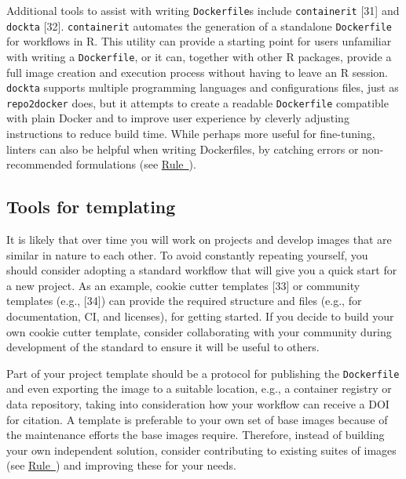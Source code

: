 \documentclass[10pt,letterpaper]{article}
\begin{document}
Additional tools to assist with writing \texttt{Dockerfile}s include
\texttt{containerit} {[}31{]} and \texttt{dockta} {[}32{]}.
\texttt{containerit} automates the generation of a standalone
\texttt{Dockerfile} for workflows in R. This utility can provide a
starting point for users unfamiliar with writing a \texttt{Dockerfile},
or it can, together with other R packages, provide a full image creation
and execution process without having to leave an R session.
\texttt{dockta} supports multiple programming languages and
configurations files, just as \texttt{repo2docker} does, but it attempts
to create a readable \texttt{Dockerfile} compatible with plain Docker
and to improve user experience by cleverly adjusting instructions to
reduce build time. While perhaps more useful for fine-tuning, linters
can also be helpful when writing Dockerfiles, by catching errors or
non-recommended formulations (see
\hyperref[{rule:usage}]{Rule~}).

\hypertarget{tools-for-templating}{%
\subsection{Tools for templating}\label{tools-for-templating}}

It is likely that over time you will work on projects and develop images
that are similar in nature to each other. To avoid constantly repeating
yourself, you should consider adopting a standard workflow that will
give you a quick start for a new project. As an example, cookie cutter
templates {[}33{]} or community templates (e.g., {[}34{]}) can provide
the required structure and files (e.g., for documentation, CI, and
licenses), for getting started. If you decide to build your own cookie
cutter template, consider collaborating with your community during
development of the standard to ensure it will be useful to others.

Part of your project template should be a protocol for publishing the
\texttt{Dockerfile} and even exporting the image to a suitable location,
e.g., a container registry or data repository, taking into consideration
how your workflow can receive a DOI for citation. A template is
preferable to your own set of base images because of the maintenance
efforts the base images require. Therefore, instead of building your own
independent solution, consider contributing to existing suites of images
(see \hyperref[{rule:base}]{Rule~}) and improving
these for your needs.
\end{document}
